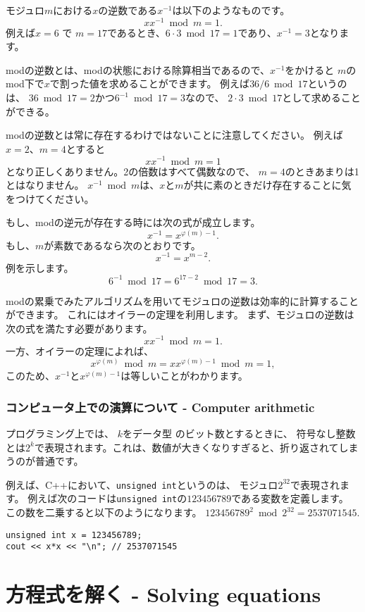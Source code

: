 モジュロ$m$における$x$の逆数である$x^{-1}$は以下のようなものです。
\[ x x^{-1} \bmod m = 1. \]
例えば$x=6$ で $m=17$であるとき、$6\cdot3 \bmod 17=1$であり、$x^{-1}=3$となります。

modの逆数とは、modの状態における除算相当であるので、$x^{-1}$をかけると
$m$のmod下で$x$で割った値を求めることができます。
例えば$36/6 \bmod 17$というのは、
$36 \bmod 17 = 2$かつ$6^{-1} \bmod 17 = 3$なので、
$2 \cdot 3 \bmod 17$として求めることができる。

modの逆数とは常に存在するわけではないことに注意してください。
例えば$x=2$、$m=4$とすると
\[ x x^{-1} \bmod m = 1 \]
となり正しくありません。2の倍数はすべて偶数なので、
$m = 4$のときあまりは1とはなりません。
$x^{-1} \bmod m$は、$x$と$m$が共に素のときだけ存在することに気をつけてください。

もし、modの逆元が存在する時には次の式が成立します。
\[
x^{-1} = x^{\varphi(m)-1}.
\]
もし、$m$が素数であるなら次のとおりです。
\[
x^{-1} = x^{m-2}.
\]
例を示します。
\[6^{-1} \bmod 17 =6^{17-2} \bmod 17 = 3.\]

modの累乗でみたアルゴリズムを用いてモジュロの逆数は効率的に計算することができます。
これにはオイラーの定理を利用します。
まず、モジュロの逆数は次の式を満たす必要があります。
\[
x x^{-1} \bmod m = 1.
\]
一方、オイラーの定理によれば、
\[
x^{\varphi(m)} \bmod m =  xx^{\varphi(m)-1} \bmod m = 1,
\]
このため、$x^{-1}$と$x^{\varphi(m)-1}$は等しいことがわかります。

\subsubsection{コンピュータ上での演算について - Computer arithmetic}

プログラミング上では、
$k$をデータ型 のビット数とするときに、
符号なし整数とは$2^k$で表現されます。これは、数値が大きくなりすぎると、折り返されてしまうのが普通です。

例えば、C++において、\texttt{unsigned int}というのは、
モジュロ$2^{32}$で表現されます。
例えば次のコードは\texttt{unsigned int}の$123456789$である変数を定義します。
この数を二乗すると以下のようになります。
$123456789^2 \bmod 2^{32} = 2537071545$.

\begin{lstlisting}
unsigned int x = 123456789;
cout << x*x << "\n"; // 2537071545
\end{lstlisting}

\section{方程式を解く - Solving equations}

